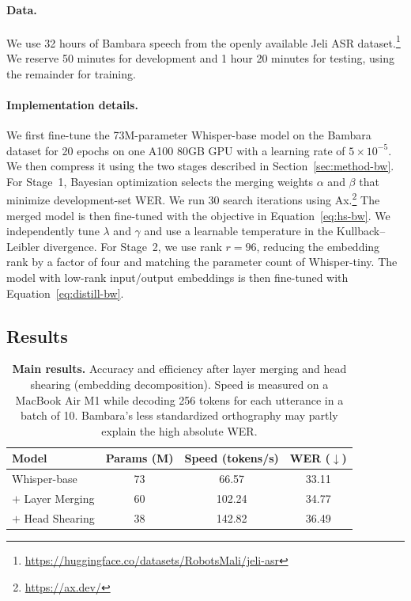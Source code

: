 \paragraph{Data.}
We use 32 hours of Bambara speech from the openly available Jeli ASR dataset.\footnote{\url{https://huggingface.co/datasets/RobotsMali/jeli-asr}} We reserve 50 minutes for development and 1 hour 20 minutes for testing, using the remainder for training.

\paragraph{Implementation details.}
We first fine-tune the 73M-parameter Whisper-base model on the Bambara dataset for 20 epochs on one A100 80GB GPU with a learning rate of \(5\times10^{-5}\). We then compress it using the two stages described in Section~\ref{sec:method-bw}. For Stage~1, Bayesian optimization selects the merging weights \(\alpha\) and \(\beta\) that minimize development-set WER. We run 30 search iterations using Ax.\footnote{\url{https://ax.dev/}} The merged model is then fine-tuned with the objective in Equation~\ref{eq:hs-bw}. We independently tune \(\lambda\) and \(\gamma\) and use a learnable temperature in the Kullback--Leibler divergence. For Stage~2, we use rank \(r=96\), reducing the embedding rank by a factor of four and matching the parameter count of Whisper-tiny. The model with low-rank input/output embeddings is then fine-tuned with Equation~\ref{eq:distill-bw}.

\subsection{Results}

\begin{table}[ht]
    \centering
    \begin{tabular}{lccc}
    \toprule
    \textbf{Model} & \textbf{Params (M)} & \textbf{Speed (tokens/s)} & \textbf{WER (\(\downarrow\))} \\
    \midrule
    Whisper-base & 73 & 66.57 & 33.11 \\
    \(+\) Layer Merging & 60 & 102.24 & 34.77 \\
    \(+\) Head Shearing & 38 & 142.82 & 36.49 \\
    \bottomrule
    \end{tabular}
    \caption{\textbf{Main results.} Accuracy and efficiency after layer merging and head shearing (embedding decomposition). Speed is measured on a MacBook Air M1 while decoding 256 tokens for each utterance in a batch of 10. Bambara's less standardized orthography may partly explain the high absolute WER.}
    \label{tab:results-bw}
\end{table}

